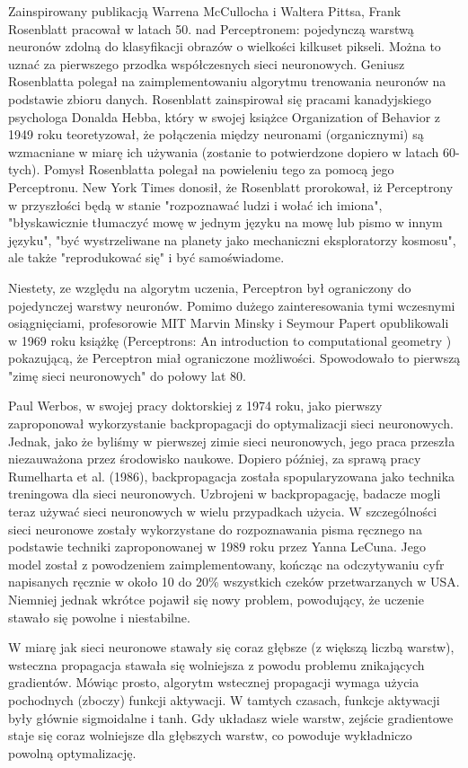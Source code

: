 \documentclass{article}
\begin{document}
Zainspirowany publikacją Warrena McCullocha i Waltera Pittsa, Frank Rosenblatt pracował w latach 50. nad Perceptronem: pojedynczą warstwą neuronów zdolną do klasyfikacji obrazów o wielkości kilkuset pikseli.
Można to uznać za pierwszego przodka współczesnych sieci neuronowych.
Geniusz Rosenblatta polegał na zaimplementowaniu algorytmu trenowania neuronów na podstawie zbioru danych.
Rosenblatt zainspirował się pracami kanadyjskiego psychologa Donalda Hebba, który w swojej książce Organization of Behavior z 1949 roku teoretyzował, że połączenia między neuronami (organicznymi) są wzmacniane w miarę ich używania (zostanie to potwierdzone dopiero w latach 60-tych).
Pomysł Rosenblatta polegał na powieleniu tego za pomocą jego Perceptronu.
New York Times donosił, że Rosenblatt prorokował, iż Perceptrony w przyszłości będą w stanie "rozpoznawać ludzi i wołać ich imiona", "błyskawicznie tłumaczyć mowę w jednym języku na mowę lub pismo w innym języku", "być wystrzeliwane na planety jako mechaniczni eksploratorzy kosmosu", ale także "reprodukować się" i być samoświadome.

Niestety, ze względu na algorytm uczenia, Perceptron był ograniczony do pojedynczej warstwy neuronów.
Pomimo dużego zainteresowania tymi wczesnymi osiągnięciami, profesorowie MIT Marvin Minsky i Seymour Papert opublikowali w 1969 roku książkę (Perceptrons: An introduction to computational geometry ) pokazującą, że Perceptron miał ograniczone możliwości.
Spowodowało to pierwszą "zimę sieci neuronowych" do połowy lat 80.

Paul Werbos, w swojej pracy doktorskiej z 1974 roku, jako pierwszy zaproponował wykorzystanie backpropagacji do optymalizacji sieci neuronowych.
Jednak, jako że byliśmy w pierwszej zimie sieci neuronowych, jego praca przeszła niezauważona przez środowisko naukowe.
Dopiero później, za sprawą pracy Rumelharta et al. (1986), backpropagacja została spopularyzowana jako technika treningowa dla sieci neuronowych.
Uzbrojeni w backpropagację, badacze mogli teraz używać sieci neuronowych w wielu przypadkach użycia.
W szczególności sieci neuronowe zostały wykorzystane do rozpoznawania pisma ręcznego na podstawie techniki zaproponowanej w 1989 roku przez Yanna LeCuna.
Jego model został z powodzeniem zaimplementowany, kończąc na odczytywaniu cyfr napisanych ręcznie w około 10 do 20\% wszystkich czeków przetwarzanych w USA.
Niemniej jednak wkrótce pojawił się nowy problem, powodujący, że uczenie stawało się powolne i niestabilne.

W miarę jak sieci neuronowe stawały się coraz głębsze (z większą liczbą warstw), wsteczna propagacja stawała się wolniejsza z powodu problemu znikających gradientów.
Mówiąc prosto, algorytm wstecznej propagacji wymaga użycia pochodnych (zboczy) funkcji aktywacji.
W tamtych czasach, funkcje aktywacji były głównie sigmoidalne i tanh.
Gdy układasz wiele warstw, zejście gradientowe staje się coraz wolniejsze dla głębszych warstw, co powoduje wykładniczo powolną optymalizację.
\end{document}
